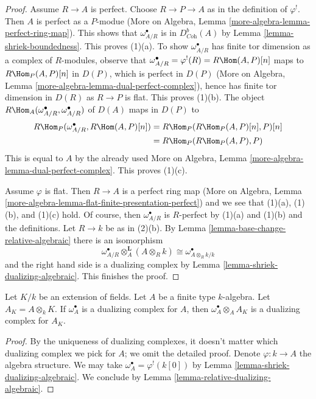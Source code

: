 \begin{proof}
Assume $R \to A$ is perfect. Choose $R \to P \to A$ as in the definition
of $\varphi^!$. Then $A$ is perfect as a $P$-modue
(More on Algebra, Lemma \ref{more-algebra-lemma-perfect-ring-map}).
This shows that $\omega_{A/R}^\bullet$ is in $D^b_{\textit{Coh}}(A)$
by Lemma \ref{lemma-shriek-boundedness}. This proves (1)(a).
To show $\omega_{A/R}^\bullet$ has finite tor dimension
as a complex of $R$-modules, observe that
$\omega_{A/R}^\bullet = \varphi^!(R) = R\Hom(A, P)[n]$
maps to $R\Hom_P(A, P)[n]$ in $D(P)$, which is perfect in $D(P)$
(More on Algebra, Lemma \ref{more-algebra-lemma-dual-perfect-complex}),
hence has finite tor dimension in $D(R)$
as $R \to P$ is flat. This proves (1)(b). The object
$R\Hom_A(\omega_{A/R}^\bullet, \omega_{A/R}^\bullet)$
of $D(A)$ maps in $D(P)$ to
\begin{align*}
R\Hom_P(\omega_{A/R}^\bullet, R\Hom(A, P)[n])
& =
R\Hom_P(R\Hom_P(A, P)[n], P)[n] \\
& =
R\Hom_P(R\Hom_P(A, P), P)
\end{align*}
This is equal to $A$ by the already used
More on Algebra, Lemma \ref{more-algebra-lemma-dual-perfect-complex}.
This proves (1)(c).

\medskip\noindent
Assume $\varphi$ is flat. Then $R \to A$ is a perfect ring map
(More on Algebra, Lemma
\ref{more-algebra-lemma-flat-finite-presentation-perfect})
and we see that (1)(a), (1)(b), and (1)(c) hold.
Of course, then $\omega_{A/R}^\bullet$ is $R$-perfect by
(1)(a) and (1)(b) and the definitions.
Let $R \to k$ be as in (2)(b).
By Lemma \ref{lemma-base-change-relative-algebraic}
there is an isomorphism
$$
\omega_{A/R}^\bullet \otimes_A^\mathbf{L} (A \otimes_R k) \cong
\omega^\bullet_{A \otimes_R k/k}
$$
and the right hand side is a dualizing complex by
Lemma \ref{lemma-shriek-dualizing-algebraic}. This finishes the proof.
\end{proof}

\begin{lemma}
\label{lemma-base-change-dualizing-over-field}
Let $K/k$ be an extension of fields. Let $A$ be a finite type
$k$-algebra. Let $A_K = A \otimes_k K$. If
$\omega_A^\bullet$ is a dualizing complex for $A$, then
$\omega_A^\bullet \otimes_A A_K$ is a dualizing complex for $A_K$.
\end{lemma}

\begin{proof}
By the uniqueness of dualizing complexes, it doesn't matter which
dualizing complex we pick for $A$; we omit the detailed proof.
Denote $\varphi : k \to A$ the algebra structure.
We may take $\omega_A^\bullet = \varphi^!(k[0])$ by
Lemma \ref{lemma-shriek-dualizing-algebraic}.
We conclude by
Lemma \ref{lemma-relative-dualizing-algebraic}.
\end{proof}

